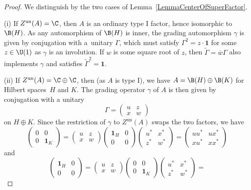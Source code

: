 \begin{proof}
We distinguish by the two cases of Lemma~\ref{LemmaCenterOfSuperFactor}.

(i) If $Z^{\mathrm{un}}(A) = \C$, then $A$ is an ordinary type I factor, hence isomorphic to $\B(H)$.
As any automorphism of $\B(H)$ is inner, the grading automorphism $\gamma$ is given by conjugation with a~unitary $\Gamma$, which must satisfy $\Gamma^2 = z \cdot\mathbf{1}$ for some $z \in \U(1)$ as $\gamma$ is an involution.
If $w$ is some square root of $z$, then $\tilde{\Gamma} = \overline{w} \Gamma$ also implements $\gamma$ and satisfies $\tilde{\Gamma}^2 = \mathbf{1}$.

(ii) If $Z^{\mathrm{un}}(A) = \C \oplus \C$, then (as $A$ is type I), we have $A = \B(H) \oplus \B(K)$ for Hilbert spaces~$H$ and $K$.
The grading operator $\gamma$ of $A$ is then given by conjugation with a unitary
\begin{equation*}
 \Gamma = \begin{pmatrix} u & z \\ x & w \end{pmatrix}
\end{equation*}
on $H \oplus K$.
Since the restriction of $\gamma$ to $Z^{\mathrm{un}}(A)$ swaps the two factors, we have
\begin{equation*}
\begin{pmatrix} 0 & 0 \\ 0 & \mathbf{1}_K \end{pmatrix}
 = \begin{pmatrix} u & z \\ x & w \end{pmatrix}\begin{pmatrix} \mathbf{1}_H & 0 \\ 0 & 0 \end{pmatrix}\begin{pmatrix} u^* & x^* \\ z^* & w^* \end{pmatrix} =
 \begin{pmatrix} uu^* & u x^* \\ xu^* & xx^* \end{pmatrix}
 \end{equation*}
 and
 \begin{equation*}
\begin{pmatrix} \mathbf{1}_H & 0 \\ 0 & 0 \end{pmatrix}
 = \begin{pmatrix} u & z \\ x & w \end{pmatrix}\begin{pmatrix} 0 & 0 \\ 0 & \mathbf{1}_K \end{pmatrix}\begin{pmatrix} u^* & x^* \\ z^* & w^* \end{pmatrix} =

\end{equation*}
\end{proof}
